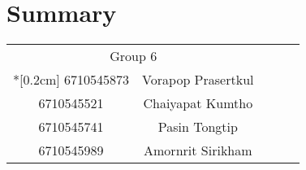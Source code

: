 \chapter*{Summary}
\lipsum
\begin{flushright}
    \begin{tabular}{cclll}
        \multicolumn{2}{c}{Group 6}     &  &  &  \\*[0.2cm]
        6710545873 & Vorapop Prasertkul &  &  &  \\
        6710545521 & Chaiyapat Kumtho   &  &  &  \\
        6710545741 & Pasin Tongtip      &  &  &  \\
        6710545989 & Amornrit Sirikham  &  &  & 
    \end{tabular}
\end{flushright}